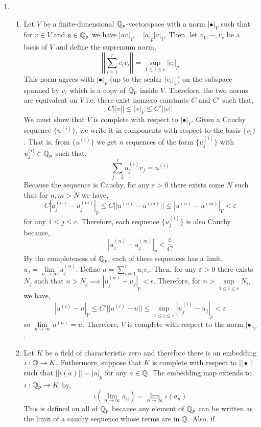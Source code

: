 \documentclass[12pt]{extarticle}
\begin{document}
 
\begin{enumerate}
\item 
\begin{enumerate}
\item Let $V$ be a finite-dimensional $\mathbb{Q}_p$-vectorspace with a norm $| \bullet |_V$ such that for $v \in V$ and $a \in \mathbb{Q}_p$ we have $|a v|_V = |a|_p |v|_V$. Then, let $v_1, \cdots, v_r$ be a basis of $V$ and define the supremum norm,
\[ \left|\left| \sum_{i = 1}^r c_i v_i \right|\right| = \sup\limits_{1 \le i \le r} |c_i|_p \]
This norm agrees with $|\bullet|_V$ (up to the scalar $|v_i|_V$) on the subspace spanned by $v_i$ which is a copy of $\mathbb{Q}_p$ inside $V$. Therefore, the two norms are equivalent on $V$ i.e. there exist nonzero constants $C$ and $C'$ such that,
\[ C||v|| \le |v|_V \le C' ||v|| \]
We must show that $V$ is complete with respect to $|\bullet|_V$. Given a Cauchy sequence $\{u^{(i)} \}$, we write it in components with respect to the basis $\{v_i\}$. That is, from $\{u^{(i)}\}$ we get $n$ sequences of the form $\{u^{(i)}_j\}$ with $u^{(i)}_j \in \mathbb{Q}_p$ such that,
\[ \sum_{j = 1}^r u^{(i)}_j v_j = u^{(i)}\]
Because the sequence is Cauchy, for any $\varepsilon > 0$ there exists some $N$ such that for $n, m > N$ we have,
\[ C |u^{(n)}_j - u^{(m)}_j|_p \le C ||u^{(n)} - u^{(m)}|| \le |u^{(n)} - u^{(m)} |_V < \varepsilon \]
for any $1 \le j \le r$. Therefore, each sequence $\{u^{(i)}_j\}$ is also Cauchy because,
\[ |u^{(n)}_j - u^{(m)}_j|_p < \frac{\varepsilon}{C}\]
By the completeness of $\mathbb{Q}_p$, each of these sequences has a limit, $u_j = \lim\limits_{n \to \infty} u^{(n)}_j$. Define $u = \sum_{i = 1}^r u_i v_i$. Then, for any $\varepsilon > 0$ there exists $N_j$ such that $n > N_j \implies |u^{(n)}_j - u_j|_p < \epsilon$. Therefore, for $n > \sup\limits_{1 \le i \le r} N_i$, we have,  
\[ |u^{(i)} - u|_V \le C' ||u^{(i)} - u|| \le \sup\limits_{1 \le j \le r} |u^{(i)}_j - u_j|_p < \varepsilon\]
so $\lim\limits_{n \to \infty} u^{(n)} = u$. Therefore, $V$ is complete with respect to the norm $|\bullet|_V$. 
\item Let $K$ be a field of characteristic zero and therefore there is an embedding $\iota : \mathbb{Q} \to K$. Futhermore, suppose that $K$ is complete with respect to $|| \bullet||$ such that $||\iota(a)|| = |a|_p$ for any $a \in \mathbb{Q}$. The embedding map extends to $\iota : \mathbb{Q}_p \to K$ by,
\[\iota( \lim \limits_{n \to \infty} a_n) = \lim\limits_{n \to \infty} \iota(a_n) \]
This is defined on all of $\mathbb{Q}_p$ because any element of $\mathbb{Q}_p$ can be written as the limit of a cauchy sequence whose terms are in $\mathbb{Q}$. Also, if 

\end{enumerate}
\end{enumerate}
\end{document}
